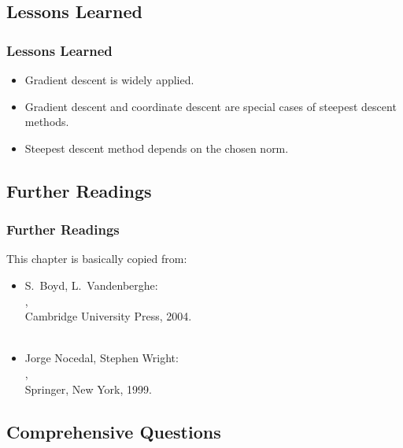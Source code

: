 \subsection{Lessons Learned}

\begin{frame}
  \frametitle{Lessons Learned}

  \begin{itemize}
    \item Gradient descent is widely applied. \\[.25cm]
    \item Gradient descent and coordinate descent are special cases of steepest descent methods. \\[.25cm]
    \item Steepest descent method depends on the chosen norm.
  \end{itemize}
\end{frame}



\subsection{Further Readings}

\begin{frame}
  \frametitle{Further Readings}

  This chapter is basically copied from: \\[.25cm]
 
  \begin{itemize}
    \item S.~Boyd, L.~Vandenberghe: \\
      , \\
      Cambridge University Press, 2004. \\
       \\[.25cm]
    \item Jorge Nocedal, Stephen Wright: \\
      , \\
      Springer, New York, 1999.
  \end{itemize}
\end{frame}


\subsection{Comprehensive Questions}

